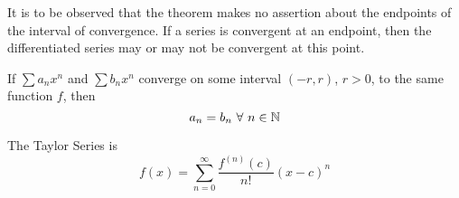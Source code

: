 \begin{remark}
	It is to be observed that the theorem makes no assertion about the endpoints of the interval of convergence. If a series is convergent at an endpoint, then the differentiated series may or may not be convergent at this point.
\end{remark}

\begin{theorem}
	If $\sum a_nx^n$ and $\sum b_nx^n$ converge on some interval $(-r,r)$, $r>0$, to the same function $f$, then
	\[a_n=b_n\ \forall\ n \in \mathbb{N}\]
\end{theorem}

The Taylor Series is
\[f(x)=\sum\limits_{n=0}^{\infty}\frac{f^{(n)}(c)}{n!}(x-c)^n\]
